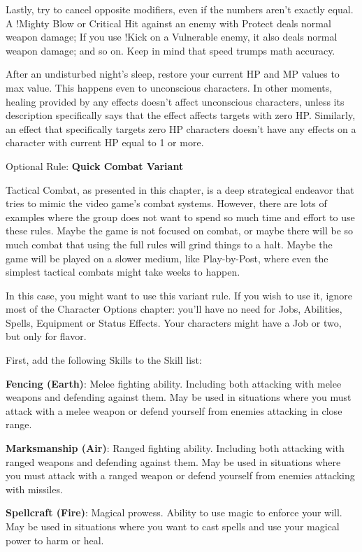 \begin{multicols}{2}
Lastly, try to cancel opposite modifiers,
even if the numbers aren't exactly equal.
A !Mighty Blow or Critical Hit against an enemy
with Protect deals normal weapon damage; If you
use !Kick on a Vulnerable enemy, it also deals
normal weapon damage; and so on. Keep in mind
that speed trumps math accuracy.

After an undisturbed night's sleep, restore
your current HP and MP values to max value. This
happens even to unconscious characters. In other
moments, healing provided by any effects doesn’t
affect unconscious characters, unless its
description specifically says that the effect affects
targets with zero HP. Similarly, an effect that
specifically targets zero HP characters doesn’t
have any effects on a character with current HP
equal to 1 or more.

Optional Rule: \textbf{Quick Combat Variant}

Tactical Combat, as presented in this
chapter, is a deep strategical endeavor that tries
to mimic the video game's combat systems.
However, there are lots of examples where the
group does not want to spend so much time and
effort to use these rules. Maybe the game is not
focused on combat, or maybe there will be so
much combat that using the full rules will grind
things to a halt. Maybe the game will be played
on a slower medium, like Play-by-Post, where
even the simplest tactical combats might take
weeks to happen.

In this case, you might want to use this
variant rule. If you wish to use it, ignore most of
the Character Options chapter: you'll have no
need for Jobs, Abilities, Spells, Equipment or
Status Effects. Your characters might have a Job
or two, but only for flavor.

First, add the following Skills to the Skill
list:

\textbf{Fencing (Earth)}: Melee fighting ability.
Including both attacking with melee weapons
and defending against them. May be used in
situations where you must attack with a melee
weapon or defend yourself from enemies
attacking in close range.

\textbf{Marksmanship (Air)}: Ranged fighting
ability. Including both attacking with ranged
weapons and defending against them. May be
used in situations where you must attack with a
ranged weapon or defend yourself from enemies
attacking with missiles.

\textbf{Spellcraft (Fire)}: Magical prowess. Ability
to use magic to enforce your will. May be used in
situations where you want to cast spells and use
your magical power to harm or heal.


\end{multicols}
